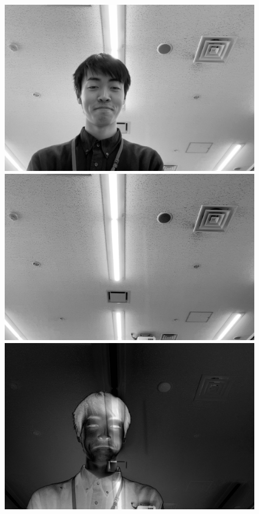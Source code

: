 \begin{figure}[h]
\begin{minipage}[b]{.49\textwidth}
\begin{minipage}[b]{.3\textwidth}
            \includegraphics[keepaspectratio,width=\textwidth]{../../05_UnderstandingImages/fig1_g.jpg}
        \end{minipage}
        \begin{minipage}[b]{.3\textwidth}
            \centering
            \includegraphics[keepaspectratio,width=\textwidth]{../../05_UnderstandingImages/fig2_g.jpg}
        \end{minipage}
        \begin{minipage}[b]{.3\textwidth}
            \centering
            \includegraphics[keepaspectratio,width=\textwidth]{../../Figures/05_60.png}

\end{minipage}
\end{minipage}
\end{figure}
